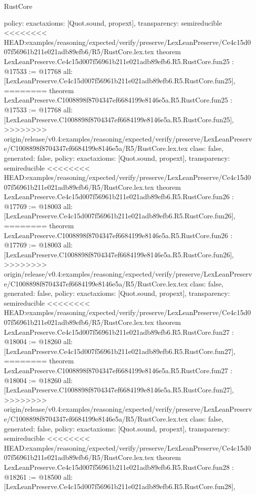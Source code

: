 \begin{lexlean}{RustCore}
\begin{coremodule}
{\begin{coremodule}
{{{{{{{{{{{{{{{{{{{{{{{{{{{{  policy: exact{axioms: [Quot.sound, propext]},
  transparency: semireducible
}
<<<<<<<< HEAD:examples/reasoning/expected/verify/preserve/LexLeanPreserve/Ce4c15d007f56961b211e021adb89efb6/R5/RustCore.lex.tex
theorem LexLeanPreserve.Ce4c15d007f56961b211e021adb89efb6.R5.RustCore.fun25 : @17533 := @17768 {
  all: [LexLeanPreserve.Ce4c15d007f56961b211e021adb89efb6.R5.RustCore.fun25],
========
theorem LexLeanPreserve.C1008898f8704347ef6684199e8146e5a.R5.RustCore.fun25 : @17533 := @17768 {
  all: [LexLeanPreserve.C1008898f8704347ef6684199e8146e5a.R5.RustCore.fun25],
>>>>>>>> origin/release/v0.4:examples/reasoning/expected/verify/preserve/LexLeanPreserve/C1008898f8704347ef6684199e8146e5a/R5/RustCore.lex.tex
  class: false,
  generated: false,
  policy: exact{axioms: [Quot.sound, propext]},
  transparency: semireducible
}
<<<<<<<< HEAD:examples/reasoning/expected/verify/preserve/LexLeanPreserve/Ce4c15d007f56961b211e021adb89efb6/R5/RustCore.lex.tex
theorem LexLeanPreserve.Ce4c15d007f56961b211e021adb89efb6.R5.RustCore.fun26 : @17769 := @18003 {
  all: [LexLeanPreserve.Ce4c15d007f56961b211e021adb89efb6.R5.RustCore.fun26],
========
theorem LexLeanPreserve.C1008898f8704347ef6684199e8146e5a.R5.RustCore.fun26 : @17769 := @18003 {
  all: [LexLeanPreserve.C1008898f8704347ef6684199e8146e5a.R5.RustCore.fun26],
>>>>>>>> origin/release/v0.4:examples/reasoning/expected/verify/preserve/LexLeanPreserve/C1008898f8704347ef6684199e8146e5a/R5/RustCore.lex.tex
  class: false,
  generated: false,
  policy: exact{axioms: [Quot.sound, propext]},
  transparency: semireducible
}
<<<<<<<< HEAD:examples/reasoning/expected/verify/preserve/LexLeanPreserve/Ce4c15d007f56961b211e021adb89efb6/R5/RustCore.lex.tex
theorem LexLeanPreserve.Ce4c15d007f56961b211e021adb89efb6.R5.RustCore.fun27 : @18004 := @18260 {
  all: [LexLeanPreserve.Ce4c15d007f56961b211e021adb89efb6.R5.RustCore.fun27],
========
theorem LexLeanPreserve.C1008898f8704347ef6684199e8146e5a.R5.RustCore.fun27 : @18004 := @18260 {
  all: [LexLeanPreserve.C1008898f8704347ef6684199e8146e5a.R5.RustCore.fun27],
>>>>>>>> origin/release/v0.4:examples/reasoning/expected/verify/preserve/LexLeanPreserve/C1008898f8704347ef6684199e8146e5a/R5/RustCore.lex.tex
  class: false,
  generated: false,
  policy: exact{axioms: [Quot.sound, propext]},
  transparency: semireducible
}
<<<<<<<< HEAD:examples/reasoning/expected/verify/preserve/LexLeanPreserve/Ce4c15d007f56961b211e021adb89efb6/R5/RustCore.lex.tex
theorem LexLeanPreserve.Ce4c15d007f56961b211e021adb89efb6.R5.RustCore.fun28 : @18261 := @18500 {
  all: [LexLeanPreserve.Ce4c15d007f56961b211e021adb89efb6.R5.RustCore.fun28],
}}}}}}}}}}}}}}}}}}}}}}}}}}}}}}}
\end{coremodule}}
\end{coremodule}
\end{lexlean}

